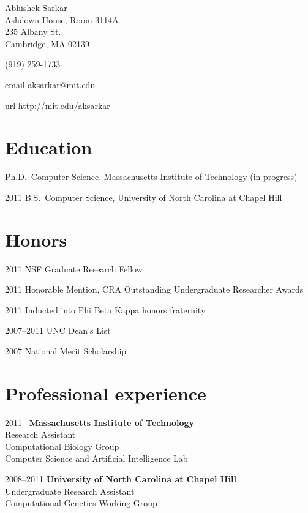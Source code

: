\documentclass{article}
\begin{document}
{\LARGE Abhishek Sarkar\vspace{1em}}\\
Ashdown House, Room 3114A\\
235 Albany St.\\
Cambridge, MA 02139\vspace{1em}

(919) 259-1733\vspace{1em}

\begin{hdesc}
\item[email] \url{aksarkar@mit.edu}
\item[url] \url{http://mit.edu/aksarkar}
\end{hdesc}

\section*{Education}
\begin{hdesc}
\item[] Ph.D.\ Computer Science, Massachusetts Institute of Technology (in
  progress)
\item[2011] B.S.\ Computer Science, University of North Carolina at
  Chapel Hill
\end{hdesc}

\section*{Honors}
\begin{hdesc}
\item[2011] NSF Graduate Research Fellow
\item[2011] Honorable Mention, CRA Outstanding Undergraduate Researcher Awards
\item[2011] Inducted into Phi Beta Kappa honors fraternity
\item[2007--2011] UNC Dean's List
\item[2007] National Merit Scholarship
\end{hdesc}

\section*{Professional experience}
\begin{hdesc}[itemsep=1em]
\item[2011--] \textbf{Massachusetts Institute of Technology}\\
Research Assistant\\
Computational Biology Group\\
Computer Science and Artificial Intelligence Lab

\item[2008--2011] \textbf{University of North Carolina at Chapel Hill}\\
Undergraduate Research Assistant\\
Computational Genetics Working Group
\end{hdesc}
\end{document}
